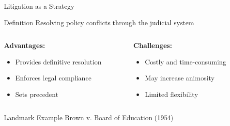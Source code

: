 \documentclass[10pt]{beamer}
\begin{document}
\begin{frame}{Litigation as a Strategy}
    \begin{block}{Definition}
        Resolving policy conflicts through the judicial system
    \end{block}
    
    \begin{columns}[T]
        \begin{column}{0.5\textwidth}
            \textbf{Advantages:}
            \begin{itemize}
                \item Provides definitive resolution
                \item Enforces legal compliance
                \item Sets precedent
            \end{itemize}
        \end{column}
        \begin{column}{0.5\textwidth}
            \textbf{Challenges:}
            \begin{itemize}
                \item Costly and time-consuming
                \item May increase animosity
                \item Limited flexibility
            \end{itemize}
        \end{column}
    \end{columns}
    
    \begin{exampleblock}{Landmark Example}
        \centering
        Brown v. Board of Education (1954)\\
    \end{exampleblock}
\end{frame}
\end{document}
